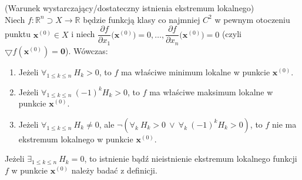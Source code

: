 \begin{tw}{(Warunek wystarczający/dostateczny istnienia ekstremum lokalnego)}\\
Niech $f:\mathbb{R}^n\supset X\rightarrow\mathbb{R}$ będzie funkcją klasy co najmniej $C^2$ w pewnym otoczeniu punktu $\textbf{x}^{(0)}\in X$ i niech $\dfrac{\partial f}{\partial x_1}\big(\textbf{x}^{(0)}\big)=0,\ldots,\dfrac{\partial f}{\partial x_n}\big(\textbf{x}^{(0)}\big)=0$ (czyli $\bigtriangledown f(\textbf{x}^{(0)})=\textbf{0}$). Wówczas:
\begin{enumerate}[\rm 1.]
\item
Jeżeli $\forall_{1\leq k\leq n}\ H_k>0$, to $f$ ma właściwe minimum lokalne w punkcie $\textbf{x}^{(0)}$.
\item
Jeżeli $\forall_{1\leq k\leq n}\ (-1)^kH_k>0$, to $f$ ma właściwe maksimum lokalne w punkcie $\textbf{x}^{(0)}$.
\item
Jeżeli $\forall_{1\leq k\leq n}\ H_k\neq 0$, ale $\neg(\forall_k\ H_k>0\ \vee\ \forall_k\ (-1)^kH_k>0)$, to $f$ nie ma ekstremum lokalnego w punkcie $\textbf{x}^{(0)}$.
\end{enumerate}
\end{tw}

\begin{uwg}
Jeżeli $\exists_{1\leq k\leq n}\ H_k=0$, to istnienie bądź nieistnienie ekstremum lokalnego funkcji $f$ w punkcie $\textbf{x}^{(0)}$ należy badać z definicji.
\end{uwg}


